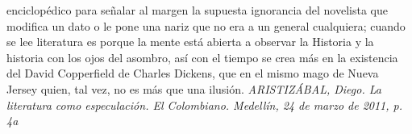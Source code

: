 \documentclass[a4paper,12pt]{article}\usepackage[utf8]{inputenc}\usepackage[spanish]{babel}\usepackage{times}
\begin{document}
enciclopédico para señalar al margen la supuesta ignorancia del novelista que modifica un dato o le pone una nariz que no era a un general cualquiera; cuando se lee literatura es porque la mente está abierta a observar la Historia y la historia con los ojos del asombro, así con el tiempo se crea más en la existencia del David Copperfield de Charles Dickens, que en el mismo mago de Nueva Jersey quien, tal vez, no es más que una ilusión. \newline \textsl{ ARISTIZÁBAL, Diego. La literatura como especulación. El Colombiano. Medellín, 24 de marzo de 2011, p. 4a } \newline
\end{document}
